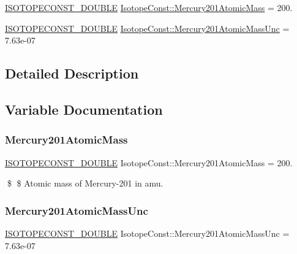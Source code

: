 \begin{DoxyCompactItemize}
\item 
\mbox{\hyperlink{group___isotope_const-_macros_ga8f45a7272ce02c0b4c65c44636ed719a}{I\+S\+O\+T\+O\+P\+E\+C\+O\+N\+S\+T\+\_\+\+D\+O\+U\+B\+LE}} \mbox{\hyperlink{group___isotope_const-_mercury-_hg201_gaa264158d241b730e2cdbffd8d8bd2a00}{Isotope\+Const\+::\+Mercury201\+Atomic\+Mass}} = 200.
\item 
\mbox{\hyperlink{group___isotope_const-_macros_ga8f45a7272ce02c0b4c65c44636ed719a}{I\+S\+O\+T\+O\+P\+E\+C\+O\+N\+S\+T\+\_\+\+D\+O\+U\+B\+LE}} \mbox{\hyperlink{group___isotope_const-_mercury-_hg201_ga11c73bd24fd0f53c99006435375f9218}{Isotope\+Const\+::\+Mercury201\+Atomic\+Mass\+Unc}} = 7.\+63e-\/07
\end{DoxyCompactItemize}


\subsection{Detailed Description}


\subsection{Variable Documentation}
\mbox{\label{group___isotope_const-_mercury-_hg201_gaa264158d241b730e2cdbffd8d8bd2a00}} 
\subsubsection{\texorpdfstring{Mercury201\+Atomic\+Mass}{Mercury201AtomicMass}}
{\footnotesize\ttfamily \mbox{\hyperlink{group___isotope_const-_macros_ga8f45a7272ce02c0b4c65c44636ed719a}{I\+S\+O\+T\+O\+P\+E\+C\+O\+N\+S\+T\+\_\+\+D\+O\+U\+B\+LE}} Isotope\+Const\+::\+Mercury201\+Atomic\+Mass = 200.}

\$ \$ Atomic mass of Mercury-\/201 in amu. \mbox{\label{group___isotope_const-_mercury-_hg201_ga11c73bd24fd0f53c99006435375f9218}} 
\subsubsection{\texorpdfstring{Mercury201\+Atomic\+Mass\+Unc}{Mercury201AtomicMassUnc}}
{\footnotesize\ttfamily \mbox{\hyperlink{group___isotope_const-_macros_ga8f45a7272ce02c0b4c65c44636ed719a}{I\+S\+O\+T\+O\+P\+E\+C\+O\+N\+S\+T\+\_\+\+D\+O\+U\+B\+LE}} Isotope\+Const\+::\+Mercury201\+Atomic\+Mass\+Unc = 7.\+63e-\/07}

